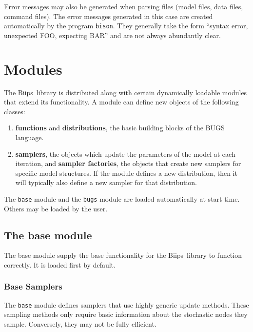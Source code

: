 \documentclass[11pt, a4paper, titlepage]{report}
\newcommand{\biips}{\textsf{Biips}}
\begin{document}
Error messages may also be generated when parsing files (model files,
data files, command files).  The error messages generated in this case
are created automatically by the program \texttt{bison}. They
generally take the form ``syntax error, unexpected FOO, expecting BAR''
and are not always abundantly clear.


\chapter{Modules}
\label{section:modules}

The \biips\ library is distributed along with certain dynamically
loadable modules that extend its functionality. A module can define
new objects of the following classes:
\begin{enumerate}
\item {\bf functions} and {\bf distributions}, the basic building
blocks of the BUGS language.
\item {\bf samplers}, the objects which update the parameters of the
model at each iteration, and {\bf sampler factories}, the objects that 
create new samplers for specific model structures.  If the module
defines a new distribution, then it will typically also define a new
sampler for that distribution.
\end{enumerate}

The \verb+base+ module and the \verb+bugs+ module are loaded automatically
at start time.  Others may be loaded by the user.

\section{The base module}

The base module supply the base functionality for the \biips\ library
to function correctly. It is loaded first by default.  

\subsection{Base Samplers}

The \verb+base+ module defines samplers that use highly generic update
methods.  These sampling methods only require basic information about
the stochastic nodes they sample.  Conversely, they may not be fully
efficient.
\end{document}
